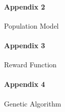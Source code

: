 \documentclass[12pt, a4paper]{article}
\begin{document}
\paragraph*{Appendix 2}
\label{app:pop_model}
Population Model
\paragraph*{Appendix 3}
\label{app:Re_fun}
Reward Function
\paragraph*{Appendix 4}
\label{app:GA}
Genetic Algorithm


 
\end{document}
